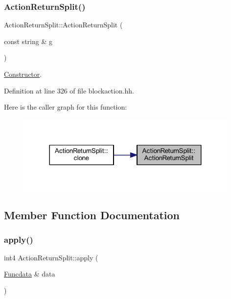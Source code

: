 \subsubsection{\texorpdfstring{ActionReturnSplit()}{ActionReturnSplit()}}
{\footnotesize\ttfamily Action\+Return\+Split\+::\+Action\+Return\+Split (\begin{DoxyParamCaption}\item[{const string \&}]{g }\end{DoxyParamCaption})\hspace{0.3cm}{\ttfamily [inline]}}



\mbox{\hyperlink{class_constructor}{Constructor}}. 



Definition at line 326 of file blockaction.\+hh.

Here is the caller graph for this function\+:
\nopagebreak
\begin{figure}[H]
\begin{center}
\leavevmode
\includegraphics[width=312pt]{class_action_return_split_a334fd9debddf6bd633666d593b50549b_icgraph}
\end{center}
\end{figure}


\subsection{Member Function Documentation}
\mbox{\label{class_action_return_split_a19c3922a6dc7e8e0af6eed9becd7c01b}} 
\subsubsection{\texorpdfstring{apply()}{apply()}}
{\footnotesize\ttfamily int4 Action\+Return\+Split\+::apply (\begin{DoxyParamCaption}\item[{\mbox{\hyperlink{class_funcdata}{Funcdata}} \&}]{data }\end{DoxyParamCaption})\hspace{0.3cm}{\ttfamily [virtual]}}



